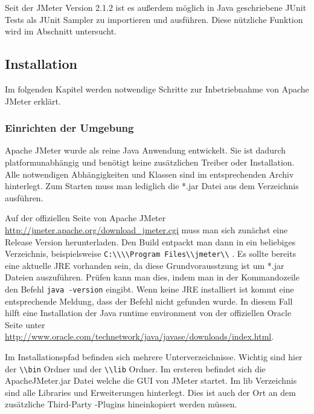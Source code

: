 \documentclass[a4paper,12pt]{article}
\newcommand{\codeInLine}[1]{%
\colorbox{graybackgroundColor}{\lstinline{#1}} %
}
\begin{document}
Seit der JMeter Version 2.1.2 ist es außerdem möglich in Java geschriebene JUnit Tests als JUnit Sampler zu importieren und ausführen. Diese nützliche Funktion wird im Abschnitt  untersucht.

\subsection{Installation}
Im folgenden Kapitel werden notwendige Schritte zur Inbetriebnahme von Apache JMeter erklärt.

\subsubsection{Einrichten der Umgebung}
Apache JMeter wurde als reine Java Anwendung entwickelt. Sie ist dadurch platformunabhängig und benötigt keine zusätzlichen Treiber oder Installation. Alle notwendigen Abhängigkeiten und Klassen sind im entsprechenden Archiv hinterlegt. Zum Starten muss man lediglich die *.jar Datei aus dem Verzeichnis ausführen.

Auf der offiziellen Seite von Apache JMeter \url{http://jmeter.apache.org/download_jmeter.cgi} muss man sich zunächst eine Release Version herunterladen. Den Build entpackt man dann in ein beliebiges Verzeichnis, beispielsweise \codeInLine{C:\\\\Program Files\\jmeter\\}.
Es sollte bereits eine aktuelle JRE vorhanden sein, da diese Grundvorausstzung ist um *.jar Dateien auszuführen. Prüfen kann man dies, indem man in der Kommandozeile den Befehl \codeInLine{java -version} eingibt. Wenn keine JRE installiert ist kommt eine entsprechende Meldung, dass der Befehl nicht gefunden wurde. In diesem Fall hilft eine Installation der Java runtime environment von der offiziellen Oracle Seite unter \url{http://www.oracle.com/technetwork/java/javase/downloads/index.html}.

Im Installationspfad befinden sich mehrere Unterverzeichnisse. Wichtig sind hier der \codeInLine{\\bin} Ordner und der \codeInLine{\\lib} Ordner. Im ersteren befindet sich die ApacheJMeter.jar Datei welche die GUI von JMeter startet. Im lib Verzeichnis sind alle Libraries und Erweiterungen hinterlegt. Dies ist auch der Ort an dem zusätzliche Third-Party -Plugins hineinkopiert werden müssen.
\end{document}
